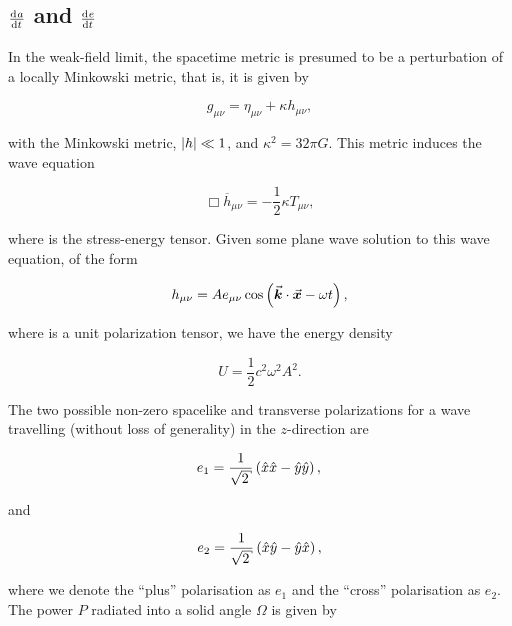 \subsection{\texorpdfstring{$\dv{a}{t}$ and $\dv{e}{t}$}{Rate of change of semimajor axis and eccentricity}}

In the weak-field limit, the spacetime metric is presumed to be a perturbation of a locally Minkowski metric, that is, it is given by

\begin{equation}
    g_{\mu\nu} = \eta_{\mu\nu} + \kappa h_{\mu\nu},
\end{equation}

with \tens{\eta} the Minkowski metric, $\left|h\right|\ll 1$, and $\kappa^2 = 32\pi G$. This metric induces \citep[see, among others,][]{Einstein:1916, Peters:1964} the wave equation

\begin{equation}
    \Box \overline{h}_{\mu\nu} = -\frac12 \kappa T_{\mu\nu},
\end{equation}

where  is the stress-energy tensor. Given some plane wave solution to this wave equation, of the form

\begin{equation}
    h_{\mu\nu}=Ae_{\mu\nu}\cos\pqty{\vec{k}\cdot\vec{x}-\omega t},
\end{equation}

where  is a unit polarization tensor, we have the energy density

\begin{equation}
    U = \frac12 c^2\omega^2A^2.
\end{equation}

The two possible non-zero spacelike and transverse polarizations for a wave travelling (without loss of generality) in the $z$-direction are

\begin{equation}
    e_1 = \frac{1}{\sqrt{2}}\pqty{\hat{x}\hat{x}-\hat{y}\hat{y}},\\
\end{equation}

and

\begin{equation}
    e_2 = \frac{1}{\sqrt{2}}\pqty{\hat{x}\hat{y}-\hat{y}\hat{x}},
\end{equation}

where we denote the ``plus'' polarisation as $e_1$ and the ``cross'' polarisation as $e_2$. The power $P$ radiated into a solid angle $\Omega$ is given by

